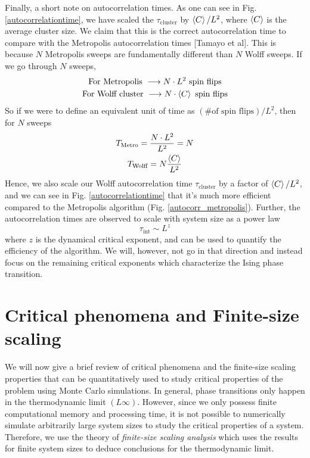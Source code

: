 \documentclass[../thesis_main.tex]{subfiles}
\begin{document}
Finally, a short note on autocorrelation times. As one can see in Fig. \ref{autocorrelationtime}, we have scaled the $\tau_\text{cluster}$ by $\expval{C}/L^2$, where $\expval{C}$ is the average cluster size. We claim that this is the correct autocorrelation time to compare with the Metropolis autocorrelation times [Tamayo et al]. This is because $N$ Metropolis sweeps are fundamentally different than $N$ Wolff sweeps. If we go through $N$ sweeps, 
\vspace{-1em}
\begin{gather*}
    \text{For Metropolis } \longrightarrow N \cdot L^2 \text{ spin flips} \\
    \text{For Wolff cluster } \longrightarrow N \cdot \expval{C} \text{ spin flips}
\end{gather*}
So if we were to define an equivalent unit of time as $(\text{\# of spin flips})/L^2$, then for $N$ sweeps
\begin{gather*}
    T_\text{Metro} = \frac{N \cdot L^2}{L^2} = N \\
    T_\text{Wolff} = N \frac{\expval{C}}{L^2}
\end{gather*}     
Hence, we also scale our Wolff autocorrelation time $\tau_\text{cluster}$ by a factor of $\expval{C}/L^2$, and we can see in Fig. \ref{autocorrelationtime} that it's much more efficient compared to the Metropolis algorithm (Fig. \ref{autocorr_metropolis}). Further, the autocorrelation times are observed to scale with system size as a power law 
\[
    \tau_\text{int} \sim L^z
\]
where $z$ is the dynamical critical exponent, and can be used to quantify the efficiency of the algorithm. We will, however, not go in that direction and instead focus on the remaining critical exponents which characterize the Ising phase transition. 

\section{Critical phenomena and Finite-size scaling}
We will now give a brief review of critical phenomena and the finite-size scaling properties that can be quantitatively used to study critical properties of the problem using Monte Carlo simulations. In general, phase transitions only happen in the thermodynamic limit $(L  \infty)$. However, since we only possess finite computational memory and processing time, it is not possible to numerically simulate arbitrarily large system sizes to study the critical properties of a system. Therefore, we use the theory of \textit{finite-size scaling analysis} which uses the results for finite system sizes to deduce conclusions for the thermodynamic limit. 
\end{document}
